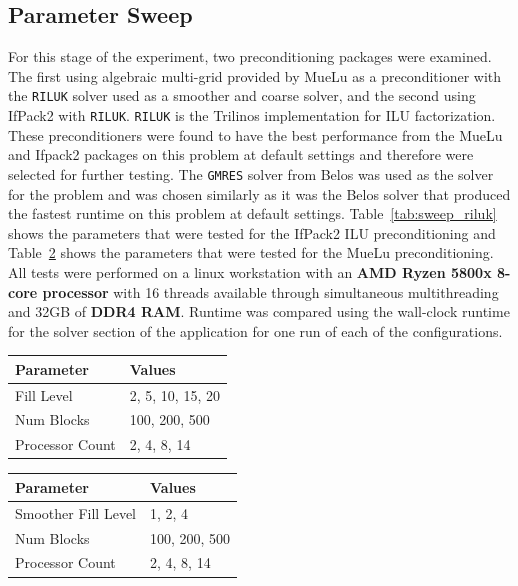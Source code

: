 \subsection{Parameter Sweep}
\label{sec:parameter_sweep}
For this stage of the experiment, two preconditioning packages were examined. The first using algebraic multi-grid provided by MueLu as a preconditioner with the \texttt{RILUK} solver used as a smoother and coarse solver, and the second using IfPack2 with \texttt{RILUK}. \texttt{RILUK} is the Trilinos implementation for ILU factorization. These preconditioners were found to have the best performance from the MueLu and Ifpack2 packages on this problem at default settings and therefore were selected for further testing. The \texttt{GMRES} solver from Belos was used as the solver for the problem and was chosen similarly as it was the Belos solver that produced the fastest runtime on this problem at default settings. Table~\ref{tab:sweep_riluk} shows the parameters that were tested for the IfPack2 ILU preconditioning and Table~\ref{tab:sweep_muelu} shows the parameters that were tested for the MueLu preconditioning. All tests were performed on a linux workstation with an \textbf{AMD Ryzen 5800x 8-core processor} with 16 threads available through simultaneous multithreading and 32GB of \textbf{DDR4 RAM}. Runtime was compared using the wall-clock runtime for the solver section of the application for one run of each of the configurations.
\begin{table}[H]
	\centering
	\begin{minipage}{0.48\textwidth}
		\centering
		\begin{tabular}{ll}
			\toprule
			\textbf{Parameter} & \textbf{Values}  \\
			\midrule
			Fill Level         & 2, 5, 10, 15, 20 \\
			Num Blocks         & 100, 200, 500    \\
			Processor Count    & 2, 4, 8, 14      \\
			\bottomrule
		\end{tabular}
		\label{tab:sweep_riluk}
	\end{minipage}
	\hfill
	\begin{minipage}{0.48\textwidth}
		\centering
		\begin{tabular}{ll}
			\toprule
			\textbf{Parameter}  & \textbf{Values} \\
			\midrule
			Smoother Fill Level & 1, 2, 4         \\
			Num Blocks          & 100, 200, 500   \\
			Processor Count     & 2, 4, 8, 14     \\
			\bottomrule
		\end{tabular}
		\label{tab:sweep_muelu}
	\end{minipage}
\end{table}
